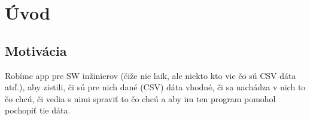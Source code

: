 \chapter*{Úvod}

\section{Motivácia}

Robíme app pre SW inžinierov (čiže nie laik, ale niekto kto vie čo sú CSV dáta atď.), aby zistili, či sú pre nich dané (CSV) dáta vhodné, či sa nachádza v nich to čo chcú, či vedia s nimi spraviť to čo chcú a aby im ten program pomohol pochopiť tie dáta.

